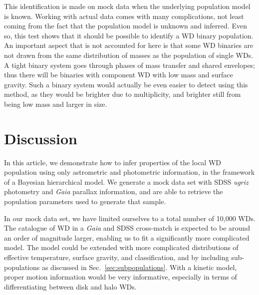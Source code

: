 \documentclass[fleqn,usenatbib]{mnras}
\begin{document}
This identification is made on mock data when the underlying population model is known. Working with actual data comes with many complications, not least coming from the fact that the population model is unknown and inferred. Even so, this test shows that it should be possible to identify a WD binary population. An important aspect that is not accounted for here is that some WD binaries are not drawn from the same distribution of masses as the population of single WDs. A tight binary system goes through phases of mass transfer and shared envelopes; thus there will be binaries with component WD with low mass and surface gravity. Such a binary system would actually be even easier to detect using this method, as they would be brighter due to multiplicity, and brighter still from being low mass and larger in size.







\section{Discussion}\label{sec:discussion}

In this article, we demonstrate how to infer properties of the local WD population using only astrometric and photometric information, in the framework of a Bayesian hierarchical model. We generate a mock data set with SDSS \emph{ugriz} photometry and \emph{Gaia} parallax information, and are able to retrieve the population parameters used to generate that sample.

In our mock data set, we have limited ourselves to a total number of 10,000 WDs. The catalogue of WD in a \emph{Gaia} and SDSS cross-match is expected to be around an order of magnitude larger, enabling us to fit a significantly more complicated model. The model could be extended with more complicated distributions of effective temperature, surface gravity, and classification, and by including sub-populations as discussed in Sec.~\ref{sec:subpopulations}. With a kinetic model, proper motion information would be very informative, especially in terms of differentiating between disk and halo WDs.
\end{document}
